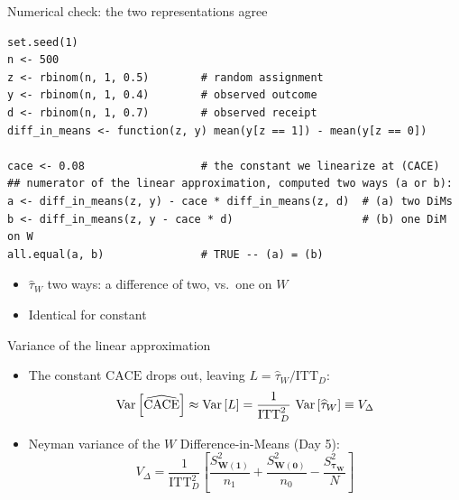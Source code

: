 \documentclass[table, xcolor = {dvipsnames}, 9pt]{beamer}
\theoremstyle{plain}
\newcommand{\mh}[1]{{\color{magenta}{#1}}}
\DeclareMathOperator{\Var}{\rm{Var}}
\newcommand{\ITTD}{\mathrm{ITT}_D}
\newcommand{\CACE}{\mathrm{CACE}}
\begin{document}
\begin{frame}[fragile]{Numerical check: the two representations agree}
\begin{lstlisting}[style=Rstyle, basicstyle=\ttfamily\scriptsize, frame=single]
set.seed(1)
n <- 500
z <- rbinom(n, 1, 0.5)        # random assignment
y <- rbinom(n, 1, 0.4)        # observed outcome
d <- rbinom(n, 1, 0.7)        # observed receipt
diff_in_means <- function(z, y) mean(y[z == 1]) - mean(y[z == 0])

cace <- 0.08                  # the constant we linearize at (CACE)
## numerator of the linear approximation, computed two ways (a or b):
a <- diff_in_means(z, y) - cace * diff_in_means(z, d)  # (a) two DiMs
b <- diff_in_means(z, y - cace * d)                    # (b) one DiM on W
all.equal(a, b)               # TRUE -- (a) = (b)
\end{lstlisting}
\vfill
\begin{itemize} \vfill
\item $\widehat{\tau}_W$ two ways: a difference of two, vs.\ one on $W$ \vfill
\item Identical for \mh{any} constant \vfill
\end{itemize}
\end{frame}
\begin{frame}[t]{Variance of the linear approximation}
\vfill
\begin{itemize} \vfill
\item The constant $\CACE$ drops out, leaving $L = \widehat{\tau}_W / \ITTD$: \vfill
\vfill
\begin{equation*}
\Var\left[\widehat{\CACE}\right] \approx \Var\left[L\right] = \frac{1}{\ITTD^2}\,\Var\left[\widehat{\tau}_W\right] \equiv V_\Delta
\end{equation*} \vfill
\item Neyman variance of the $W$ Difference-in-Means (Day 5): \vfill
\vfill
\begin{equation*}
V_\Delta = \frac{1}{\ITTD^2}\left[\frac{S^2_{\bm{W}(\bm{1})}}{n_1} + \frac{S^2_{\bm{W}(\bm{0})}}{n_0} - \frac{S^2_{\bm{\tau}_{\bm{W}}}}{N}\right]
\end{equation*} \vfill
\end{itemize} \vfill
\end{frame}
\end{document}
